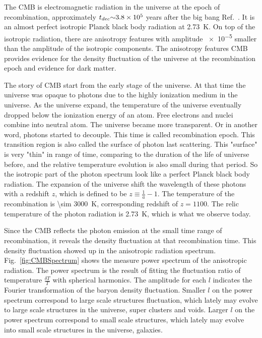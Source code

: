 The CMB is electromagnetic radiation in the universe at the epoch of recombination, approximately $t_{dec} \num{\sim 3.8e5}$ years after the big bang Ref.~\cite{Jarosik2011}. It is an almost perfect isotropic Planck black body radiation at \SI{2.73}{\kelvin}. On top of the isotropic radiation, there are anisotropy features with amplitude \num{e-5} smaller than the amplitude of the isotropic components. The anisotropy features CMB provides evidence for the density fluctuation of the universe at the recombination epoch and evidence for dark matter.

The story of CMB start from the early stage of the universe. At that time the universe was opaque to photons due to the highly ionization medium in the universe. As the universe expand, the temperature of the universe eventually dropped below the ionization energy of an atom. Free electrons and nuclei combine into neutral atom. The universe became more transparent. Or in another word, photons started to decouple. This time is called recombination epoch. This transition region is also called the surface of photon last scattering. This "surface" is very "thin" in range of time, comparing to the duration of the life of universe before, and the relative temperature evolution is also small during that period. So the isotropic part of the photon spectrum look like a perfect Planck black body radiation. The expansion of the universe shift the wavelength of these photons with a redshift $z$, which is defined to be $z \equiv \frac{1}{a} - 1$. The temperature of the recombination is \SI{\sim 3000}{\kelvin}, corresponding redshift of $z=1100$. The relic temperature of the photon radiation is \SI{2.73}{\kelvin}, which is what we observe today.

Since the CMB reflects the photon emission at the small time range of recombination, it reveals the density fluctuation at that recombination time. This density fluctuation showed up in the anisotropic radiation spectrum. Fig.~\ref{fig:CMBSpectrum} shows the measure power spectrum of the anisotropic radiation. The power spectrum is the result of fitting the fluctuation ratio of temperature $\frac{\delta T}{T}$ with spherical harmonics. The amplitude for each $l$ indicates the Fourier transformation of the baryon density fluctuation. Smaller $l$ on the power spectrum correspond to large scale structures fluctuation, which lately may evolve to large scale structures in the universe, super clusters and voids. Larger $l$ on the power spectrum correspond to small scale structures, which lately may evolve into small scale structures in the universe, galaxies.  

